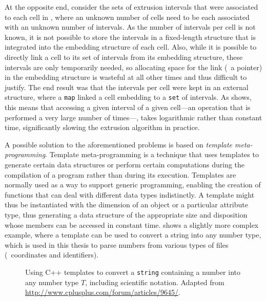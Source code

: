 At the opposite end, consider the sets of extrusion intervals that were associated to each cell in , where an unknown number of cells need to be each associated with an unknown number of intervals.
As the number of intervals per cell is not known, it is not possible to store the intervals in a fixed-length structure that is integrated into the embedding structure of each cell.
Also, while it is possible to directly link a cell to its set of intervals from its embedding structure, these intervals are only temporarily needed, so allocating space for the link (\eg\ a pointer) in the embedding structure is wasteful at all other times and thus difficult to justify.
The end result was that the intervals per cell were kept in an external structure, where a \texttt{map} linked a cell embedding to a \texttt{set} of intervals.
As  shows, this means that accessing a given interval of a given cell---an operation that is performed a very large number of times---, takes logarithmic rather than constant time, significantly slowing the extrusion algorithm in practice.

A possible solution to the aforementioned problems is based on \emph{template meta-programming}.
Template meta-programming is a technique that uses templates to generate certain data structures or perform certain computations during the compilation of a program rather than during its execution.
Templates are normally used as a way to support generic programming, enabling the creation of functions that can deal with different data types indistinctly.
A template might thus be instantiated with the dimension of an object or a particular attribute type, thus generating a data structure of the appropriate size and disposition whose members can be accessed in constant time.
 shows a slightly more complex example, where a template can be used to convert a string into any number type, which is used in this thesis to parse numbers from various types of files (\eg\ coordinates and identifiers).
\begin{figure}[tb]
\centering
\small

\caption[Using C++ templates to convert a \texttt{string} into any number type]{Using C++ templates to convert a \texttt{string} containing a number into any number type $T$, including scientific notation. Adapted from \url{http://www.cplusplus.com/forum/articles/9645/}.}
\label{fig:template-conversion}
\end{figure}

